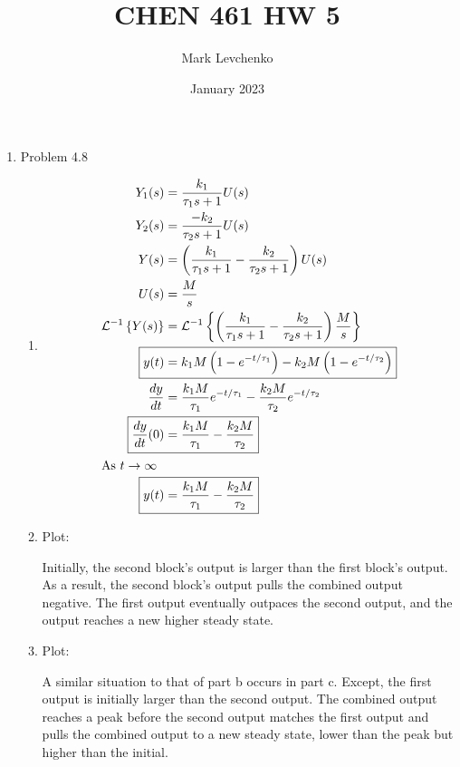 \documentclass[12pt]{article}
\title{CHEN 461 HW 5}
\author{Mark Levchenko}
\date{January 2023}
\begin{document}
\begin{enumerate}

\newpage
\item Problem 4.8
\begin{enumerate}
    \item 
    \begin{align*}
        Y_1(s) &= \frac{k_1}{\tau_1 s + 1} U(s) \\
        Y_2(s) &= \frac{-k_2}{\tau_2 s + 1} U(s) \\
        Y(s) &= \left(\frac{k_1}{\tau_1 s + 1} - \frac{k_2}{\tau_2 s + 1}\right) U(s) \\
        U(s) &= \frac{M}{s} \\
        \mathcal{L}^{-1}\left\{Y(s)\right\} &= \mathcal{L}^{-1}\left\{\left(\frac{k_1}{\tau_1 s + 1} - \frac{k_2}{\tau_2 s + 1}\right) \frac{M}{s}\right\} \\
        \Aboxed{y(t) &= k_1 M \left(1 - e^{-t/\tau_1}\right) - k_2 M \left(1 - e^{-t/\tau_2}\right)} \\
        \frac{dy}{dt} &= \frac{k_1 M}{\tau_1} e^{-t/\tau_1} - \frac{k_2 M}{\tau_2} e^{-t/\tau_2} \\
        \Aboxed{\frac{dy}{dt}(0) &= \frac{k_1 M}{\tau_1} - \frac{k_2 M}{\tau_2} }\\
        \intertext{As $t\rightarrow\infty$}
        \Aboxed{y(t) &= \frac{k_1 M}{\tau_1} - \frac{k_2 M}{\tau_2}}
    \end{align*}
    \item Plot:

    

    Initially, the second block's output is larger than the first block's output. As a result, the second block's output pulls the combined output negative. The first output eventually outpaces the second output, and the output reaches a new higher steady state.
    
    \item Plot:

    

    A similar situation to that of part b occurs in part c. Except, the first output is initially larger than the second output. The combined output reaches a peak before the second output matches the first output and pulls the combined output to a new steady state, lower than the peak but higher than the initial.
    
\end{enumerate}


\end{enumerate}
\end{document}
